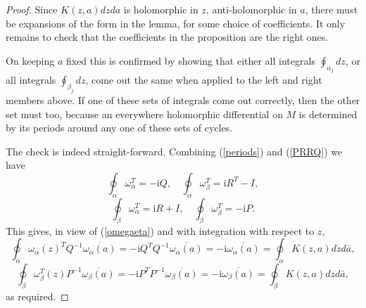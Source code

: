 \documentclass[10pt,a4paper]{amsart}
\def\I{\mathrm{i}}
\begin{document}
\begin{proof}
Since $K(z,a)dzda$ is holomorphic in $z$,
anti-holomorphic in $a$, there must be expansions of the form in the lemma, for some choice of coefficients.
It only remains to check that the coefficients in the proposition are the right ones. 

On keeping $a$ fixed this is confirmed by showing that either all integrals
$\oint_{\alpha_j}dz$, or all integrals $\oint_{\beta_j}dz$, 
come out the same when applied to the left and right members above. 
If one of these sets of integrals come out correctly, then the other set must too, because an everywhere holomorphic 
differential on $M$ is determined by its periods around any one of these sets of cycles.

The check is indeed straight-forward. Combining (\ref{periods}) and (\ref{PRRQ}) we have  
$$
\oint_\alpha \omega_{\alpha}^T =-\I Q, \quad \oint_\alpha \omega_\beta^T =\I R^T -I,
$$
$$
\oint_\beta \omega_\alpha^T =\I R+I, \quad \oint_\beta \omega_\beta^T =-\I P.
$$
This gives, in view of (\ref{omegaeta}) and with integration with respect to $z$, 
$$
\oint_{\alpha}\omega_\alpha(z)^T Q^{-1}\overline{\omega_\alpha(a)} 
=-\I Q^T Q^{-1}\overline{\omega_\alpha(a)}=-\I\overline{\omega_\alpha(a)}  
= \oint_{\alpha}K(z,a)dzd\bar{a}, 
$$
$$ 
\oint_{\beta}\omega_{\beta}^T(z)P^{-1}\overline{\omega_\beta(a)} 
=-\I P^T P^{-1}\overline{\omega_\beta(a)}=-\I\overline{\omega_\beta(a)}  
=\oint_{\beta}K(z,a)dzd\bar{a},
$$ 
as required.
\end{proof}
\end{document}
